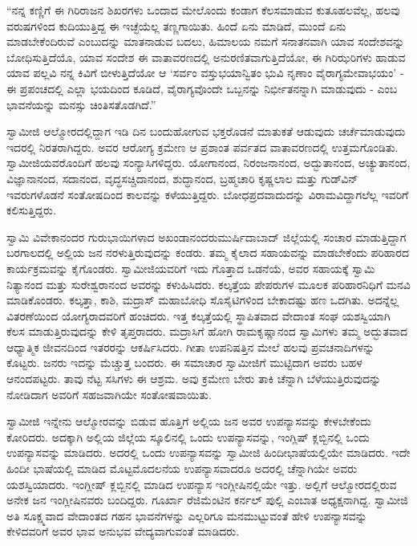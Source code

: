  “ನನ್ನ ಕಣ್ಣಿಗೆ ಈ ಗಿರಿರಾಜನ ಶಿಖರಗಳು ಒಂದಾದ ಮೇಲೊಂದು ಕಂಡಾಗ ಕೆಲಸಮಾಡುವ ಕುತೂಹಲವೆಲ್ಲ, ಹಲವು ವರುಷಗಳಿಂದ ಕುದಿಯುತ್ತಿದ್ದ ಈ ಇಚ್ಛೆಯೆಲ್ಲ ತಣ್ಣಗಾಯಿತು. ಹಿಂದೆ ಏನು ಮಾಡಿದೆ, ಮುಂದೆ ಏನು ಮಾಡಬೇಕೆಂದಿರುವೆ ಎಂಬುದನ್ನು ಮಾತನಾಡುವ ಬದಲು, ಹಿಮಾಲಯ ನಮಗೆ ಸನಾತನವಾಗಿ ಯಾವ ಸಂದೇಶವನ್ನು ಬೋಧಿಸುತ್ತಿದೆಯೊ, ಯಾವ ಸಂದೇಶ ಈ ವಾತಾವರಣದಲ್ಲಿ ಅನುರಣಿತವಾಗುತ್ತಿದೆಯೋ, ಈ ಗಿರಿಝರಿಗಳು ಹಾಡುವ ಯಾವ ಪಲ್ಲವಿ ನನ್ನ ಕಿವಿಗೆ ಬೀಳುತ್ತಿದೆಯೋ ಆ ‘ಸರ್ವಂ ವಸ್ತುಭಯಾನ್ವಿತಂ ಭುವಿ ನೃಣಾಂ ವೈರಾಗ್ಯಮೇವಾಭಯಂ’ - ಈ ಪ್ರಪಂಚದಲ್ಲಿ ಎಲ್ಲಾ ಭಯದಿಂದ ಕೂಡಿದೆ, ವೈರಾಗ್ಯವೊಂದೇ ಒಬ್ಬನನ್ನು ನಿರ್ಭೀತನನ್ನಾಗಿ ಮಾಡುವುದು - ಎಂಬ ಭಾವನೆಯನ್ನು ಮನಸ್ಸು ಚಿಂತಿಸತೊಡಗಿದೆ.” 

 ಸ್ವಾಮೀಜಿ ಆಲ್ಮೋರದಲ್ಲಿದ್ದಾಗ ಇಡಿ ದಿನ ಬಂದುಹೋಗುವ ಭಕ್ತರೊಡನೆ ಮಾತುಕತೆ ಆಡುವುದು ಚರ್ಚೆಮಾಡುವುದು ಇದರಲ್ಲಿ ನಿರತರಾಗಿದ್ದರು. ಅವರ ಆರೋಗ್ಯ ಕ್ರಮೇಣ ಆ ಪ್ರಶಾಂತ ಪರ್ವತದ ವಾತಾವರಣದಲ್ಲಿ ಉತ್ತಮಗೊಂಡಿತು. ಸ್ವಾಮೀಜಿಯವರೊಂದಿಗೆ ಹಲವು ಸಂನ್ಯಾಸಿಗಳಿದ್ದರು. ಯೋಗಾನಂದ, ನಿರಂಜನಾನಂದ, ಅದ್ಭುತಾನಂದ, ಅಚ್ಯುತಾನಂದ, ವಿಜ್ಞಾನಾನಂದ, ಸದಾನಂದ, ವೃದ್ಧಸಚ್ಚಿದಾನಂದ, ಶುದ್ಧಾನಂದ, ಬ್ರಹ್ಮಚಾರಿ ಕೃಷ್ಣಲಾಲ ಮತ್ತು ಗುಡ್‍ವಿನ್ ಇವರುಗಳೊಡನೆ ಸಂತೋಷದಿಂದ ಕಾಲವನ್ನು ಕಳೆಯುತ್ತಿದ್ದರು. ಬೋಧಪ್ರದವಾದುದನ್ನು ವಿರಾಮವಿದ್ದಾಗಲೆಲ್ಲ ಇವರಿಗೆ ಕಲಿಸುತ್ತಿದ್ದರು. 

 ಸ್ವಾಮಿ ವಿವೇಕಾನಂದರ ಗುರುಭಾಯಿಗಳಾದ ಅಖಂಡಾನಂದರು\break ಮುರ್ಷಿದಾಬಾದ್ ಜಿಲ್ಲೆಯಲ್ಲಿ ಸಂಚಾರ ಮಾಡುತ್ತಿದ್ದಾಗ ಬರಗಾಲದಲ್ಲಿ ಅಲ್ಲಿಯ ಜನ ನರಳುತ್ತಿರುವುದನ್ನು ಕಂಡರು. ತಮ್ಮ ಕೈಲಾದ ಸಹಾಯವನ್ನು ಮಾಡಬೇಕೆಂದು ಪರಿಹಾರದ ಕಾರ್ಯಕ್ರಮವನ್ನು ಕೈಗೊಂಡರು. ಸ್ವಾಮೀಜಿಯವರಿಗೆ ಇದು ಗೊತ್ತಾದ ಒಡನೆಯೆ, ಅವರ ಸಹಾಯಕ್ಕೆ ಸ್ವಾಮಿ ನಿತ್ಯಾನಂದ ಮತ್ತು ಸುರೇಶ್ವರಾನಂದ ಅವರನ್ನು ಕಳುಹಿಸಿದರು. ಕಲ್ಕತ್ತೆಯ ಪೇಪರುಗಳ ಮೂಲಕ ಪರಿಹಾರನಿಧಿಗೆ ಮನವಿ ಮಾಡಿಕೊಂಡರು. ಕಲ್ಕತ್ತಾ, ಕಾಶಿ, ಮದ್ರಾಸ್ ಮಹಾಬೋಧಿ ಸೊಸೈಟಿಗಳಿಂದ ಬೇಕಾದಷ್ಟು ಹಣ ಒದಗಿತು. ಅದನ್ನೆಲ್ಲ ವಿತರಣೆಯಿಂದ ಯೋಗ್ಯರಾದವರಿಗೆ ಹಂಚಿದರು. ಇತ್ತ ಕಲ್ಕತ್ತೆಯಲ್ಲಿ ಸ್ಥಾಪಿತವಾದ ವೇದಾಂತ ಸಂಘ ಯಶಸ್ವಿಯಾಗಿ ಕೆಲಸ ಮಾಡುತ್ತಿರುವುದನ್ನು ಕೇಳಿ ತೃಪ್ತರಾದರು. ಮದ್ರಾಸಿಗೆ ಹೋಗಿ ರಾಮಕೃಷ್ಣಾನಂದ ಸ್ವಾಮಿಗಳು ತಮ್ಮ ಅದ್ಭುತವಾದ ಆಧ್ಯಾತ್ಮಿಕ ಜೀವನದಿಂದ ಇತರರನ್ನು ಆಕರ್ಷಿಸಿದರು. ಗೀತಾ ಉಪನಿಷತ್ತಿನ ಮೇಲೆ ಹಲವು ಪ್ರವಚನಾದಿಗಳನ್ನು ಕೊಟ್ಟರು. ಜನರು ಇದನ್ನು ಮೆಚ್ಚುತ್ತ ಬಂದರು. ಈ ಸಮಾಚಾರ ಸ್ವಾಮೀಜಿಗೆ ಮುಟ್ಟಿದಾಗ ಅವರು ಬಹಳ ಆನಂದಪಟ್ಟರು. ತಾವು ನೆಟ್ಟ ಸಸಿಗಳು ಈ ಆಶ್ರಮ. ಅವು ಕ್ರಮೇಣ ಬೇರು ತಾಕಿ ಚೆನ್ನಾಗಿ ಬೆಳೆಯುತ್ತಿರುವುದನ್ನು ನೋಡಿದಾಗ ಅವರಿಗೆ ಸಹಜವಾಗಿಯೇ ಸಂತೋಷವಾಯಿತು. 

 ಸ್ವಾಮೀಜಿ ಇನ್ನೇನು ಆಲ್ಮೋರವನ್ನು ಬಿಡುವ ಹೊತ್ತಿಗೆ ಅಲ್ಲಿಯ ಜನ ಅವರ ಉಪನ್ಯಾಸವನ್ನು ಕೇಳಬೇಕೆಂದು ಕೋರಿದರು. ಅದಕ್ಕಾಗಿ ಅಲ್ಲಿಯ ಜಿಲ್ಲೆಯ ಸ್ಕೂಲಿನಲ್ಲಿ ಒಂದು ಉಪನ್ಯಾಸವನ್ನು, ಇಂಗ್ಲಿಷ್ ಕ್ಲಬ್ಬಿನಲ್ಲಿ ಒಂದು ಉಪನ್ಯಾಸವನ್ನು ಮಾಡಿದರು. ಅದರಲ್ಲಿ ಒಂದು ಉಪನ್ಯಾಸವನ್ನು ಸ್ವಾಮೀಜಿ ಹಿಂದೀಭಾಷೆಯಲ್ಲಿಯೇ ಮಾಡಿದರು. ಇದೇ ಹಿಂದೀ ಭಾಷೆಯಲ್ಲಿ ಮಾಡಿದ ಮೊಟ್ಟಮೊದಲನೆಯ ಉಪನ್ಯಾಸವಾದರೂ ಅದರಲ್ಲಿ ಚೆನ್ನಾಗಿಯೇ ಅವರು ಯಶಸ್ವಿಯಾದರು. ಇಂಗ್ಲೀಷ್ ಕ್ಲಬ್ಬಿನಲ್ಲಿ ಮಾಡಿದ ಉಪನ್ಯಾಸ ಇಂಗ್ಲೀಷಿನಲ್ಲಿಯೇ ಇತ್ತು. ಅಲ್ಲಿಗೆ ಆಲ್ಮೋರದಲ್ಲಿರುವ ಅನೇಕ ಜನ ಇಂಗ್ಲೀಷಿನವರು ಬಂದಿದ್ದರು. ಗೂರ್ಖಾ ರೆಜಿಮೆಂಟಿನ ಕರ್ನಲ್ ಪುಲ್ಲಿ ಎಂಬಾತ ಅಧ್ಯಕ್ಷನಾಗಿದ್ದ. ಸ್ವಾಮೀಜಿ ಅತಿ ಸೂಕ್ಷ್ಮವಾದ ವೇದಾಂತದ ಗಹನ ಭಾವನೆಗಳನ್ನು ಎಲ್ಲರಿಗೂ ಮನಮುಟ್ಟುವಂತೆ ಹೇಳಿ ಉಪನ್ಯಾಸವನ್ನು ಕೇಳಿದವರಿಗೆ ಅವರ ಭಾವ ಅನುಭವ ವೇದ್ಯವಾಗುವಂತೆ ಮಾಡಿದರು. 

